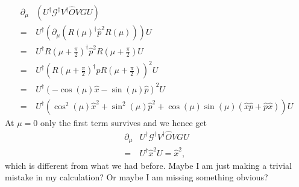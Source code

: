\documentclass[aps,pra,10pt,onecolumn,notitlepage, groupedaddress,nofootinbib]{revtex4-1}
\theoremstyle{plain}
\newcommand{\G}{\mathcal{G}}
\begin{document}
{\begin{align}
  \partial_\mu &(U^\dagger \G^\dagger V^\dagger \hat{O} V G U) \nonumber\\
  = &U^\dagger (\partial_\mu( R(\mu)^\dagger \hat{p}^2 R(\mu) )) U \\
  = &U^\dagger R(\mu+\frac{\pi}{2})^\dagger \hat{p}^2 R(\mu+\frac{\pi}{2}) U \\
  = &U^\dagger (R(\mu+\frac{\pi}{2})^\dagger \hat{p} R(\mu+\frac{\pi}{2}))^2 U \\
  = &U^\dagger (-\cos(\mu) \hat{x} - \sin(\mu) \hat{p})^2 U \\
  = &U^\dagger (\cos^2(\mu) \hat{x}^2 + \sin^2(\mu) \hat{p}^2 + \cos(\mu) \sin(\mu) (\hat{x} \hat{p} + \hat{p} \hat{x})) U
\end{align}
At $\mu = 0$ only the first term survives and we hence get
\begin{align}
  \partial_\mu &U^\dagger \G^\dagger V^\dagger \hat{O} V G U \nonumber\\
    = &U^\dagger \hat{x}^2 U = \hat{x}^2 ,
\end{align}
which is different from what we had before.
Maybe I am just making a trivial mistake in my calculation? Or maybe I am missing something obvious?
}\\
\end{document}
